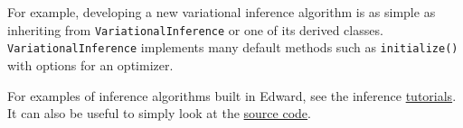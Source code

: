 For example, developing a new variational inference algorithm is as simple as
inheriting from \texttt{VariationalInference} or one of its derived
classes. \texttt{VariationalInference} implements many default methods such
as \texttt{initialize()} with options for an optimizer.

For examples of inference algorithms built in Edward, see the inference
\href{/tutorials/}{tutorials}. It can also be useful to simply look at
the
\href{https://github.com/blei-lab/edward/tree/master/edward/inferences}
{source code}.
